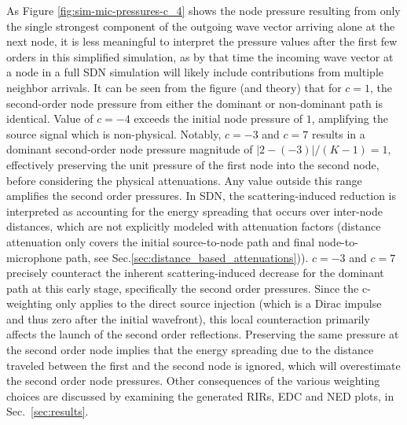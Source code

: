 \documentclass[journal]{IEEEtran}
\begin{document}
As Figure \ref{fig:sim-mic-pressures-c_4} shows the node pressure resulting from only the single strongest component of the outgoing wave vector arriving alone at the next node, it is less meaningful to interpret the pressure values after the first few orders in this simplified simulation, as by that time the incoming wave vector at a node in a full SDN simulation will likely include contributions from multiple neighbor arrivals. 
It can be seen from the figure (and theory) that for $c=1$, the second-order node pressure from either the dominant or non-dominant path is identical. 
Value of $c=-4$ exceeds the initial node pressure of $1$, amplifying the source signal which is non-physical. 
Notably, $c=-3$ and $c=7$ results in a dominant second-order node pressure magnitude of $|2-(-3)|/(K-1)=1$, 
effectively preserving the unit pressure of the first node into the second node, before considering the physical attenuations. Any value outside this range amplifies the second order pressures. In SDN, the scattering-induced reduction is interpreted as accounting for the energy spreading that occurs over inter-node distances, which are not explicitly modeled with attenuation factors (distance attenuation only covers the initial source-to-node path and final node-to-microphone path, see Sec.\ref{sec:distance_based_attenuations})). $c=-3$ and $c=7$ precisely counteract the inherent scattering-induced decrease for the dominant path at this early stage, specifically the second order pressures. Since the c-weighting only applies to the direct source injection (which is a Dirac impulse and thus zero after the initial wavefront), this local counteraction primarily affects the launch of the second order reflections. Preserving the same pressure at the second order node implies that the energy spreading due to the distance traveled between the first and the second node is ignored, which will overestimate the second order node pressures. Other consequences of the various weighting choices are discussed by examining the generated RIRs, EDC and NED plots, in Sec.~\ref{sec:results}.
\end{document}

